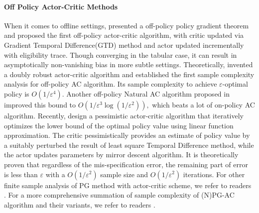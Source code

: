 \documentclass{article}
\numberwithin{equation}{section}
\begin{document}
\paragraph{Off Policy Actor-Critic Methods} When it comes to offline settings, \cite{degris2012off} presented a off-policy policy gradient theorem and proposed the first off-policy actor-critic algorithm, with critic updated via Gradient Temporal Difference(GTD) method\cite{sutton2009fast} and actor updated incrementally with eligibility trace. Though converging in the tabular case, it can result in asymptotically non-vanishing bias in more subtle settings. Theoretically, \cite{xu2021doubly} invented a doubly robust actor-critic algorithm and established the first sample complexity analysis for off-policy AC algorithm. Its sample complexity to achieve $\varepsilon$-optimal policy is $O(1/\varepsilon^4).$ Another off-policy Natural AC algorithm proposed in \cite{khodadadian2021finite} improved this bound to $O(1/\varepsilon^3 \log(1/\varepsilon^2)),$ which beats a lot of on-policy AC algorithm. Recently, \cite{zanette2021provable}  design a pessimistic actor-critic algorithm that iteratively optimizes the lower bound of the optimal policy value using linear function approximation. The critic pessimistically provides an estimate of policy value by a suitably perturbed the result of least square Temporal Difference method, while the actor updates parameters by mirror descent algorithm. It is theoretically proven that regardless of the mis-specification error, the remaining part of error is less than $\varepsilon$ with a $O(1/\varepsilon^2)$ sample size and $O(1/\varepsilon^2)$ iterations. For other finite sample analysis of PG method with actor-critic scheme, we refer to readers \cite{kumar2019sample2,xiong2020non,qiu2021finite,khodadadian2021finite,maei2018convergent,zhang2020provably}. For a more comprehensive summation of sample complexity of (N)PG-AC algorithm and their variants, we refer to readers \cite{agarwal2021theory,xu2020improving}.
\end{document}
